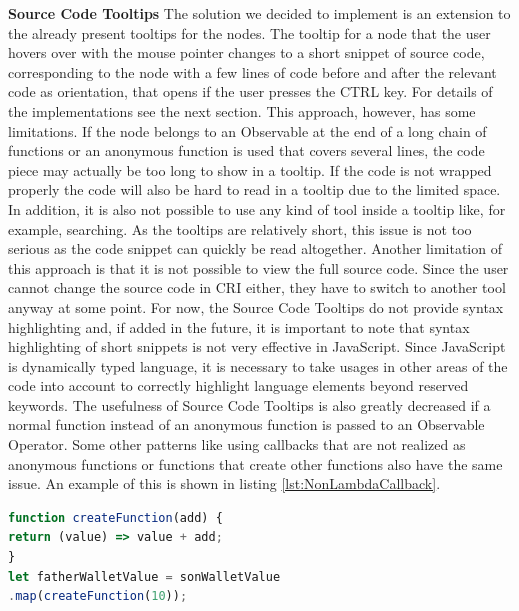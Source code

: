 \textbf{Source Code Tooltips}
The solution we decided to implement is an extension to the already present tooltips for the nodes. The tooltip for a node that the user hovers over with the mouse pointer changes to a short snippet of source code, corresponding to the node with a few lines of code before and after the relevant code as orientation, that opens if the user presses the CTRL key. For details of the implementations see the next section. This approach, however, has some limitations. If the node belongs to an Observable at the end of a long chain of functions or an anonymous function is used that covers several lines, the code piece may actually be too long to show in a tooltip. If the code is not wrapped properly the code will also be hard to read in a tooltip due to the limited space. In addition, it is also not possible to use any kind of tool inside a tooltip like, for example, searching. As the tooltips are relatively short, this issue is not too serious as the code snippet can quickly be read altogether. Another limitation of this approach is that it is not possible to view the full source code. Since the user cannot change the source code in CRI either, they have to switch to another tool anyway at some point. For now, the Source Code Tooltips do not provide syntax highlighting and, if added in the future, it is important to note that syntax highlighting of short snippets is not very effective in JavaScript. Since JavaScript is dynamically typed language, it is necessary to take usages in other areas of the code into account to correctly highlight language elements beyond reserved keywords. The usefulness of Source Code Tooltips is also greatly decreased if a normal function instead of an anonymous function is passed to an Observable Operator. Some other patterns like using callbacks that are not realized as anonymous functions or functions that create other functions also have the same issue. An example of this is shown in listing \ref{lst:NonLambdaCallback}.

\begin{lstlisting}[language=JavaScript, caption={Example of using a creation function in RxJS.},label={lst:NonLambdaCallback}]
function createFunction(add) {
return (value) => value + add;
}
let fatherWalletValue = sonWalletValue
.map(createFunction(10));
\end{lstlisting}

